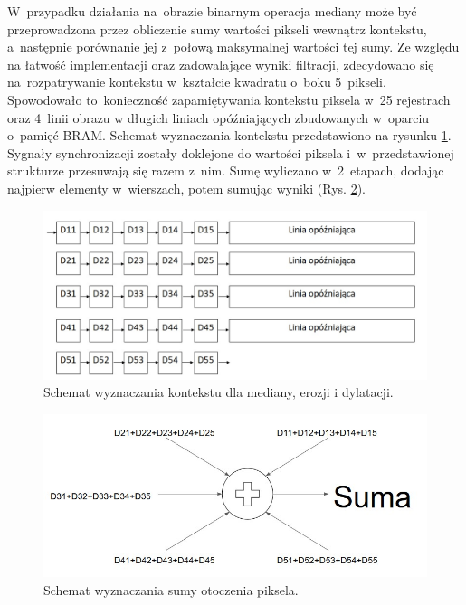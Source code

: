 W~przypadku działania na~obrazie binarnym operacja mediany może być przeprowadzona przez obliczenie sumy wartości pikseli wewnątrz kontekstu, a~następnie porównanie jej z~połową maksymalnej wartości tej sumy. 
Ze względu na łatwość implementacji oraz zadowalające wyniki filtracji, zdecydowano się na~rozpatrywanie kontekstu w~kształcie kwadratu o~boku 5~pikseli. 
Spowodowało to~konieczność zapamiętywania kontekstu piksela w~25 rejestrach oraz 4~linii obrazu w długich liniach opóźniających zbudowanych w~oparciu o~pamięć BRAM.
Schemat wyznaczania kontekstu przedstawiono na rysunku \ref{fig:kontekst}. 
Sygnały synchronizacji zostały doklejone do wartości piksela i~w~przedstawionej strukturze przesuwają się razem z~nim. 
Sumę wyliczano w~2~etapach, dodając najpierw elementy w~wierszach, potem sumując wyniki (Rys. \ref{fig:drzewo_sumacyjne}).
\begin{figure}[h]
	\centering
	\includegraphics[width=\textwidth]{kontekst.jpg}
	\caption{Schemat wyznaczania kontekstu dla mediany, erozji i dylatacji.}
	\label{fig:kontekst}
\end{figure}  
\begin{figure}[h]
	\centering
	\includegraphics[width=\textwidth]{drzewo_sumacyjne.jpg}
	\caption{Schemat wyznaczania sumy otoczenia piksela.}
	\label{fig:drzewo_sumacyjne}
\end{figure}  

